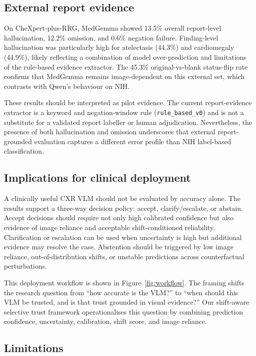 \subsection{External report evidence}

On CheXpert-plus-RRG, MedGemma showed 13.5\% overall report-level hallucination, 12.2\% omission, and 0.6\% negation failure. Finding-level hallucination was particularly high for atelectasis (44.3\%) and cardiomegaly (44.9\%), likely reflecting a combination of model over-prediction and limitations of the rule-based evidence extractor. The 45.3\% original-vs-blank status-flip rate confirms that MedGemma remains image-dependent on this external set, which contrasts with Qwen’s behaviour on NIH.

These results should be interpreted as pilot evidence. The current report-evidence extractor is a keyword and negation-window rule (\texttt{rule\_based\_v0}) and is not a substitute for a validated report labeller or human adjudication. Nevertheless, the presence of both hallucination and omission underscores that external report-grounded evaluation captures a different error profile than NIH label-based classification.

\subsection{Implications for clinical deployment}

A clinically useful CXR VLM should not be evaluated by accuracy alone. The results support a three-way decision policy: accept, clarify/escalate, or abstain. Accept decisions should require not only high calibrated confidence but also evidence of image reliance and acceptable shift-conditioned reliability. Clarification or escalation can be used when uncertainty is high but additional evidence may resolve the case. Abstention should be triggered by low image reliance, out-of-distribution shifts, or unstable predictions across counterfactual perturbations.

This deployment workflow is shown in Figure~\ref{fig:workflow}. The framing shifts the research question from “how accurate is the VLM?” to “when should this VLM be trusted, and is that trust grounded in visual evidence?” Our shift-aware selective trust framework operationalises this question by combining prediction confidence, uncertainty, calibration, shift score, and image reliance.

\subsection{Limitations}

